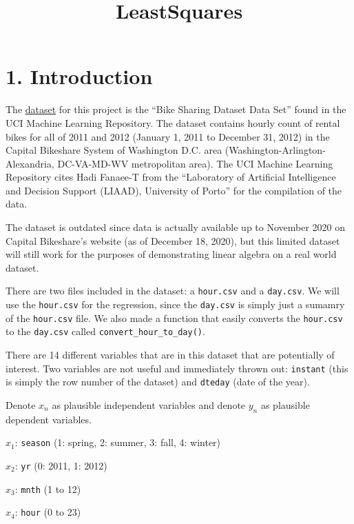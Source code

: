 \documentclass[
]{article}
\title{LeastSquares}
\author{}
\date{\vspace{-2.5em}}
\begin{document}
\maketitle

\hypertarget{introduction}{%
\section{1. Introduction}\label{introduction}}

The \color{blue}
\href{https://www.archive.ics.uci.edu/ml/datasets/Bike+Sharing+Dataset}{dataset}
\color{black} for this project is the ``Bike Sharing Dataset Data Set''
found in the UCI Machine Learning Repository. The dataset contains
hourly count of rental bikes for all of 2011 and 2012 (January 1, 2011
to December 31, 2012) in the Capital Bikeshare System of Washington D.C.
area (Washington-Arlington-Alexandria, DC-VA-MD-WV metropolitan area).
The UCI Machine Learning Repository cites Hadi Fanaee-T from the
``Laboratory of Artificial Intelligence and Decision Support (LIAAD),
University of Porto'' for the compilation of the data.

The dataset is outdated since data is actually available up to November
2020 on Capital Bikeshare's website (as of December 18, 2020), but this
limited dataset will still work for the purposes of demonstrating linear
algebra on a real world dataset.

There are two files included in the dataset: a \texttt{hour.csv} and a
\texttt{day.csv}. We will use the \texttt{hour.csv} for the regression,
since the \texttt{day.csv} is simply just a sumamry of the
\texttt{hour.csv} file. We also made a function that easily converts the
\texttt{hour.csv} to the \texttt{day.csv} called
\texttt{convert\_hour\_to\_day()}.

There are 14 different variables that are in this dataset that are
potentially of interest. Two variables are not useful and immediately
thrown out: \texttt{instant} (this is simply the row number of the
dataset) and \texttt{dteday} (date of the year).

Denote \(x_{n}\) as plausible independent variables and denote \(y_{n}\)
as plausible dependent variables.

\(x_{1}\): \texttt{season} (1: spring, 2: summer, 3: fall, 4: winter)

\(x_{2}\): \texttt{yr} (0: 2011, 1: 2012)

\(x_{3}\): \texttt{mnth} (1 to 12)

\(x_{4}\): \texttt{hour} (0 to 23)
\end{document}
